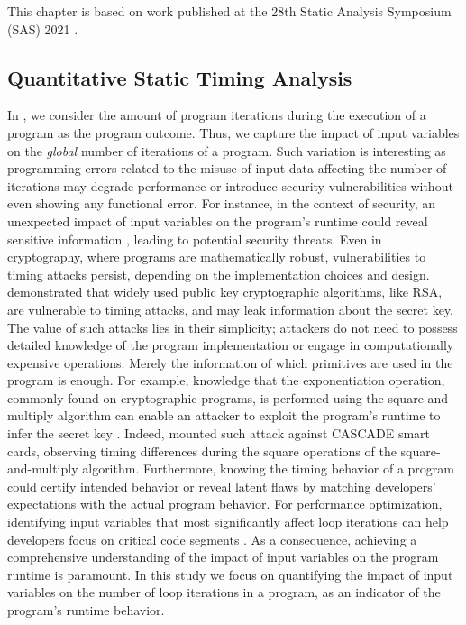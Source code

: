 This chapter is based on work published at the 28th Static Analysis Symposium (SAS) 2021 .

\subsection{Quantitative Static Timing Analysis}

In , we consider the amount of program iterations during the execution of a program as the program outcome.
Thus, we capture the impact of input variables on the \emph{global} number of iterations of a program.
Such variation is interesting as programming errors related to the misuse of input data affecting the number of iterations may degrade performance or introduce security vulnerabilities without even showing any functional error.
For instance, in the context of security, an unexpected impact of input variables on the program's runtime could reveal sensitive information , leading to potential security threats.
Even in cryptography, where programs are mathematically robust, vulnerabilities to timing attacks persist, depending on the implementation choices and design.
 demonstrated that widely used public key cryptographic algorithms, like RSA, are vulnerable to timing attacks, and may leak information about the secret key.
The value of such attacks lies in their simplicity;
attackers do not need to possess detailed knowledge of the program implementation or engage in computationally expensive operations.
Merely the information of which primitives are used in the program is enough.
For example, knowledge that the exponentiation operation, commonly found on cryptographic programs, is performed using the square-and-multiply algorithm can enable an attacker to exploit the program's runtime to infer the secret key .
Indeed,  mounted such attack against CASCADE smart cards, observing timing differences during the square operations of the square-and-multiply algorithm.
Furthermore, knowing the timing behavior of a program could certify intended behavior or reveal latent flaws by matching developers' expectations with the actual program behavior.
For performance optimization, identifying input variables that most significantly affect loop iterations can help developers focus on critical code segments .
As a consequence, achieving a comprehensive understanding of the impact of input variables on the program runtime is paramount.
In this study we focus on quantifying the impact of input variables on the number of loop iterations in a program, as an indicator of the program's runtime behavior.


